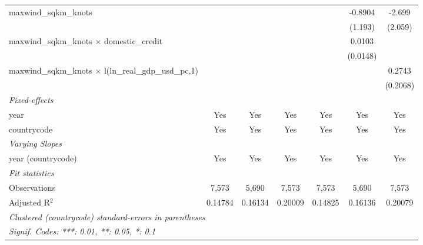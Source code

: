 \begin{tabular}{lcccccc}
   maxwind\_sqkm\_knots                                                                   &             &                         &                 &          & -0.8904                 & -2.699\\   
                                                                                          &             &                         &                 &          & (1.193)                 & (2.059)\\   
   maxwind\_sqkm\_knots $\times$ domestic\_credit                                         &             &                         &                 &          & 0.0103                  &   \\   
                                                                                          &             &                         &                 &          & (0.0148)                &   \\   
   maxwind\_sqkm\_knots $\times$ l(ln\_real\_gdp\_usd\_pc,1)                              &             &                         &                 &          &                         & 0.2743\\   
                                                                                          &             &                         &                 &          &                         & (0.2068)\\   
   \midrule
   \emph{Fixed-effects}\\
   year                                                                                   & Yes         & Yes                     & Yes             & Yes      & Yes                     & Yes\\  
   countrycode                                                                            & Yes         & Yes                     & Yes             & Yes      & Yes                     & Yes\\  
   \midrule
   \emph{Varying Slopes}\\
   year (countrycode)                                                                     & Yes         & Yes                     & Yes             & Yes      & Yes                     & Yes\\  
   \midrule
   \emph{Fit statistics}\\
   Observations                                                                           & 7,573       & 5,690                   & 7,573           & 7,573    & 5,690                   & 7,573\\  
   Adjusted R$^2$                                                                         & 0.14784     & 0.16134                 & 0.20009         & 0.14825  & 0.16136                 & 0.20079\\  
   \midrule \midrule
   \multicolumn{7}{l}{\emph{Clustered (countrycode) standard-errors in parentheses}}\\
   \multicolumn{7}{l}{\emph{Signif. Codes: ***: 0.01, **: 0.05, *: 0.1}}\\
\end{tabular}
\par\endgroup



